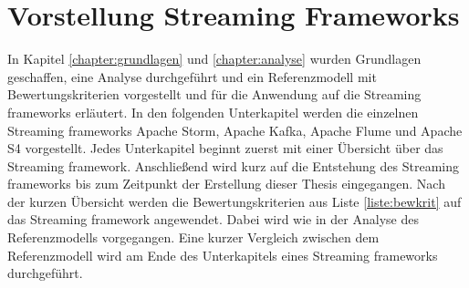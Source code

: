 \chapter{Vorstellung Streaming Frameworks}
\label{chapter:vorstellung}

In Kapitel \ref{chapter:grundlagen} und \ref{chapter:analyse} wurden Grundlagen geschaffen, eine Analyse durchgeführt und ein Referenzmodell mit Bewertungskriterien vorgestellt und für die Anwendung auf die Streaming frameworks erläutert. In den folgenden Unterkapitel werden die einzelnen Streaming frameworks Apache Storm, Apache Kafka, Apache Flume und Apache S4 vorgestellt. Jedes Unterkapitel beginnt zuerst mit einer Übersicht über das Streaming framework. Anschließend wird kurz auf die Entstehung des Streaming frameworks bis zum Zeitpunkt der Erstellung dieser Thesis eingegangen. Nach der kurzen Übersicht werden die Bewertungskriterien aus Liste \ref{liste:bewkrit} auf das Streaming framework angewendet. Dabei wird wie in der Analyse des Referenzmodells vorgegangen. Eine kurzer Vergleich zwischen dem Referenzmodell wird am Ende des Unterkapitels eines Streaming frameworks durchgeführt.









